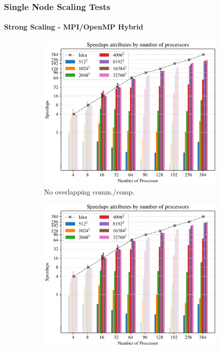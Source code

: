 \begin{frame}
  \frametitle{Single Node Scaling Tests}
  \framesubtitle{Strong Scaling - MPI/OpenMP Hybrid}
  \begin{figure}
    \centering
    \begin{subfigure}{0.47\textwidth}
      \centering
      \includegraphics[width=\textwidth]{figure/FIG_Benchmark_hybrid_0_multi_nodes.pdf}
      \caption{No overlapping comm./comp.}
      \label{FIG:Benchmark:Hybrid_0_Multi_Node}
    \end{subfigure}
    \begin{subfigure}{0.47\textwidth}
      \centering
      \includegraphics[width=\textwidth]{figure/FIG_Benchmark_hybrid_1_multi_nodes.pdf}

\end{subfigure}
\end{figure}
\end{frame}
